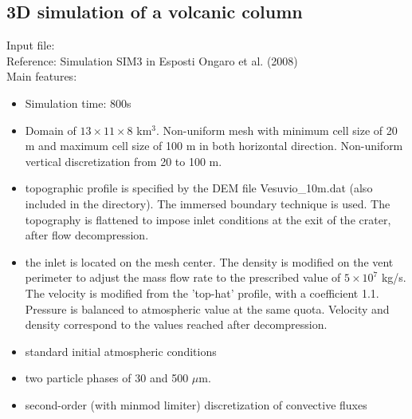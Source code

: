 \subsection{3D simulation of a volcanic column}
Input file: \\
Reference: Simulation SIM3 in Esposti Ongaro et al. (2008)\\
Main features:
\begin{itemize}
\item Simulation time: 800s
\item Domain of $13\times11\times8$ km$^3$.
      Non-uniform mesh with minimum cell size of 20 m and maximum cell size
      of 100 m in both horizontal direction. Non-uniform vertical 
      discretization from 20 to 100 m.
\item topographic profile is specified by the DEM file Vesuvio\_10m.dat
      (also included in the directory). The immersed boundary technique is used.
      The topography is flattened to impose inlet conditions at
      the exit of the crater, after flow decompression.
\item the inlet is located on the mesh center. The density is modified on 
      the vent perimeter to adjust the mass flow rate to the prescribed
      value of $5\times10^7$ kg/s. The velocity is modified from the
      'top-hat' profile, with a coefficient 1.1. 
      Pressure is balanced to atmospheric value at the same quota.
      Velocity and density correspond to the values reached after decompression.
\item standard initial atmospheric conditions 
\item two particle phases of 30 and 500 $\mu$m.
\item second-order (with minmod limiter) discretization of convective fluxes
\end{itemize}
%
\newpage
